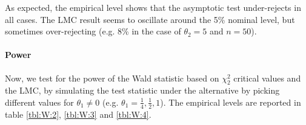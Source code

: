 \documentclass[11pt]{article}\usepackage[]{graphicx}\usepackage[]{color}
\begin{document}
\begin{table}[H]
	\centering
	\caption{Empirical levels for 1000 replications of the Wald statistic where $\alpha = 5\%$ and $\theta_1=0$, testing $H_0: \left[ \theta_1\theta_2, \theta_1\right] =0$ against $H_1: \left[ \theta_1\theta_2, \theta_1\right] \neq 0$}
	\label{tbl:W:1}
\end{table}


As expected, the empirical level shows that the asymptotic test under-rejects in all cases. The LMC result seems to oscillate around the 5\% nominal level, but sometimes over-rejecting (e.g. 8\% in the case of $\theta_2= 5 $ and $n=50$).

\paragraph{Power}

Now, we test for the power of the Wald statistic based on $\chi_2^2$ critical values and the LMC, by simulating the test statistic under the alternative by picking different values for $\theta_1\neq 0$ (e.g. $\theta_1=\frac{1}{4},\frac{1}{2},1$). The empirical levels are reported in table \ref{tbl:W:2}, \ref{tbl:W:3} and \ref{tbl:W:4}.
\end{document}
